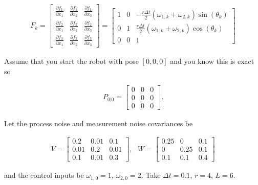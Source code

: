 \[\begin{aligned}
\displaystyle F_k =
\begin{bmatrix} \displaystyle  \frac{\partial f_1}{\partial x_1} & \displaystyle  \frac{\partial f_1}{\partial x_2}  &
\displaystyle \frac{\partial f_1}{\partial x_3}  \\[5pt]
\displaystyle  \frac{\partial f_2}{\partial x_1} & \displaystyle \frac{\partial f_2}{\partial x_2}  &
\displaystyle \frac{\partial f_2}{\partial x_3}  \\[5pt]
\displaystyle  \frac{\partial f_3}{\partial x_1} & \displaystyle \frac{\partial f_3}{\partial x_2}  &
\displaystyle \frac{\partial f_3}{\partial x_3}  \end{bmatrix}
\displaystyle  = \begin{bmatrix} 1 & 0  &
-\frac{r\Delta t}{2} (\omega_{1, k}+\omega_{2, k})\sin(\theta_k)  \\[5pt]
0 & 1  &
\frac{r\Delta t}{2} (\omega_{1, k}+\omega_{2, k})\cos(\theta_k)  \\[5pt]
0 & 0  & 1  \end{bmatrix}
\end{aligned}\]

Assume that you start the robot with pose \([0,0,0]\) and you know this
is exact so

\[\begin{aligned}
P_{0|0} = \begin{bmatrix} 0 & 0 & 0\\ 0 & 0 & 0 \\ 0 & 0 & 0 \end{bmatrix}.
\end{aligned}\]

Let the process noise and measurement noise covariances be

\[\begin{aligned}
V = \begin{bmatrix} 0.2 & 0.01 & 0.1 \\ 0.01 & 0.2 & 0.01  \\ 0.1 & 0.01 & 0.3 \end{bmatrix},~~~
W = \begin{bmatrix} 0.25 & 0 & 0.1 \\ 0 & 0.25 & 0.1  \\ 0.1 & 0.1 & 0.4 \end{bmatrix}
\end{aligned}\]

and the control inputs be \(\omega_{1,0} = 1\), \(\omega_{2,0} = 2\).
Take \(\Delta t = 0.1\), \(r=4\), \(L = 6\).

